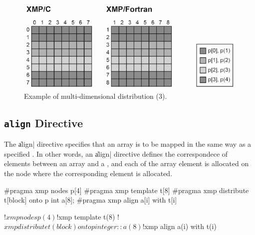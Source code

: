
\begin{figure}
  \centering
  \includegraphics[width=0.9\columnwidth]{figs/multi3.png}
  \caption{Example of multi-dimensional distribution (3).}
\end{figure}


\subsection{{\tt align} Directive}


The \|align| directive specifies that an array is to be mapped in the
same way as a specified {\template}. In other words, an \|align| directive
defines the correspondece of elements between an array and a {\template},
and each of the array element is allocated on the node where the
corresponding {\template} element is allocated.


\begin{XCexample}
#pragma xmp nodes p[4]
#pragma xmp template t[8]
#pragma xmp distribute t[block] onto p
int a[8];
#pragma xmp align a[i] with t[i]
\end{XCexample}

\begin{XFexample}
!$xmp nodes p(4)
!$xmp template t(8)
!$xmp distribute t(block) onto p
integer :: a(8)
!$xmp align a(i) with t(i)
\end{XFexample}

